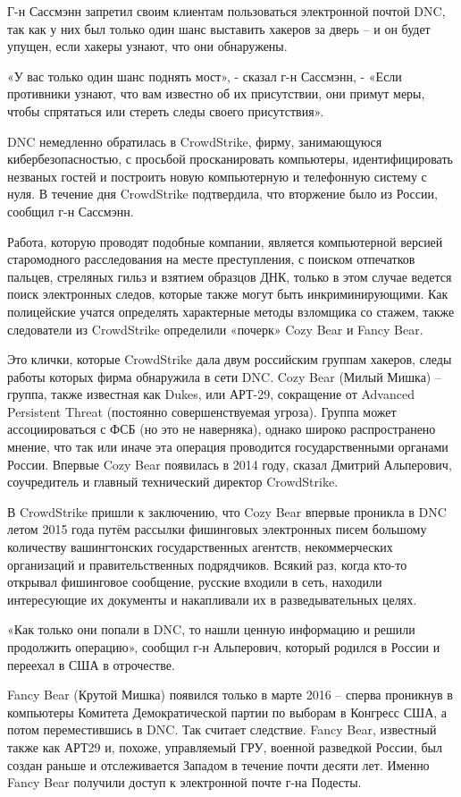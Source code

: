 Г-н Сассмэнн запретил своим клиентам пользоваться электронной почтой
DNC, так как у них был только один шанс выставить хакеров за дверь -- и
он будет упущен, если хакеры узнают, что они обнаружены.

«У вас только один шанс поднять мост», - сказал г-н Сассмэнн, - «Если
противники узнают, что вам известно об их присутствии, они примут меры,
чтобы спрятаться или стереть следы своего присутствия».

DNC немедленно обратилась в CrowdStrike, фирму, занимающуюся
кибербезопасностью, с просьбой просканировать компьютеры,
идентифицировать незваных гостей и построить новую компьютерную и
телефонную систему с нуля. В течение дня CrowdStrike подтвердила, что
вторжение было из России, сообщил г-н Сассмэнн.

Работа, которую проводят подобные компании, является компьютерной
версией старомодного расследования на месте преступления, с поиском
отпечатков пальцев, стреляных гильз и взятием образцов ДНК, только в
этом случае ведется поиск электронных следов, которые также могут быть
инкриминирующими. Как полицейские учатся определять характерные методы
взломщика со стажем, также следователи из CrowdStrike определили
«почерк» Cozy Bear и Fancy Bear.

Это клички, которые CrowdStrike дала двум российским группам хакеров,
следы работы которых фирма обнаружила в сети DNC. Cozy Bear (Милый
Мишка) -- группа, также известная как Dukes, или АРТ-29, сокращение от
Advanced Persistent Threat (постоянно совершенствуемая угроза). Группа
может ассоциироваться с ФСБ (но это не наверняка), однако широко
распространено мнение, что так или иначе эта операция проводится
государственными органами России. Впервые Cozy Bear появилась в 2014
году, сказал Дмитрий Альперович, соучредитель и главный технический
директор CrowdStrike.

В CrowdStrike пришли к заключению, что Cozy Bear впервые проникла в DNC
летом 2015 года путём рассылки фишинговых электронных писем большому
количеству вашингтонских государственных агентств, некоммерческих
организаций и правительственных подрядчиков. Всякий раз, когда кто-то
открывал фишинговое сообщение, русские входили в сеть, находили
интересующие их документы и накапливали их в разведывательных целях.

«Как только они попали в DNC, то нашли ценную информацию и решили
продолжить операцию», сообщил г-н Альперович, который родился в России и
переехал в США в отрочестве.

Fancy Bear (Крутой Мишка) появился только в марте 2016 -- сперва
проникнув в компьютеры Комитета Демократической партии по выборам в
Конгресс США, а потом переместившись в DNC. Так считает следствие. Fancy
Bear, известный также как АРТ29 и, похоже, управляемый ГРУ, военной
разведкой России, был создан раньше и отслеживается Западом в течение
почти десяти лет. Именно Fancy Bear получили доступ к электронной почте
г-на Подесты.

